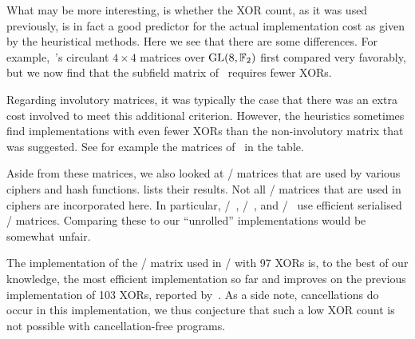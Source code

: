 What may be more interesting, is whether the XOR count, as it was used previously, is in fact a good predictor for the actual implementation cost as given by the heuristical methods.
Here we see that there are some differences.
For example,~\cite{FSE:LiWan16}'s circulant $4 \times 4$ matrices over $\mathrm{GL}(8, \mathbb{F}_2)$ first compared very favorably, but we now find that the subfield matrix of~\cite{ToSC:JPST17} requires fewer XORs.

Regarding involutory matrices, it was typically the case that there was an extra cost involved to meet this additional criterion.
However, the heuristics sometimes find implementations with even fewer XORs than the non-involutory matrix that was suggested.
See for example the matrices of~\cite{ToSC:SarSye16} in the table.

Aside from these matrices, we also looked at \MDS/ matrices that are used by various ciphers and hash functions.
 lists their results.
Not all \MDS/ matrices that are used in ciphers are incorporated here.
In particular, \led/~\cite{CHES:GPPR11}, \photon/~\cite{C:GuoPeyPos11}, and \primates/~\cite{CAESAR:primates} use efficient serialised \MDS/ matrices.
Comparing these to our \enquote{unrolled} implementations would be somewhat unfair.


The implementation of the \MDS/ matrix used in \AES/ with 97 XORs is, to the best of our knowledge, the most efficient implementation so far and improves on the previous implementation of 103 XORs, reported by~\cite{CHES:JMPS17}.
As a side note, cancellations do occur in this implementation, we thus conjecture that such a low XOR count is not possible with cancellation-free programs.

